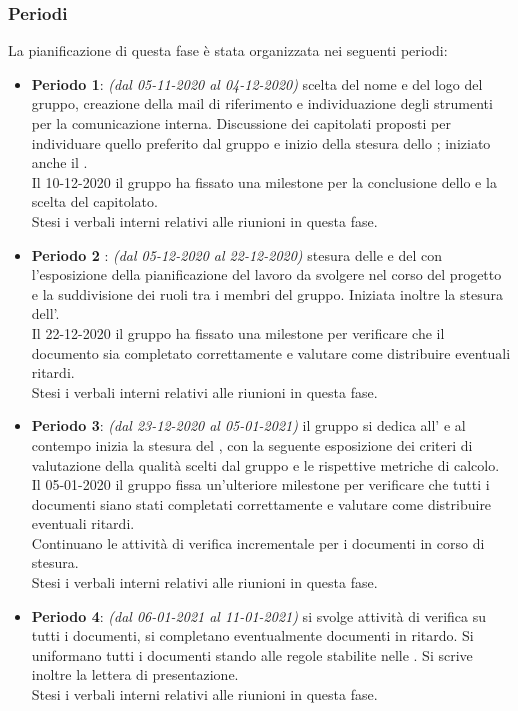 \subsubsection{Periodi}
La pianificazione di questa fase è stata organizzata nei seguenti periodi:
\begin{itemize}
\item \textbf{Periodo 1}: \textit{(dal 05-11-2020 al 04-12-2020)} scelta del nome e del logo del gruppo, creazione della mail di riferimento e individuazione degli strumenti per la comunicazione interna. Discussione dei capitolati proposti per individuare quello preferito dal gruppo e inizio della stesura dello \SdF{}; iniziato anche il \Glossario. \\Il 10-12-2020 il gruppo ha fissato una milestone\glo{} per la conclusione dello \SdF{} e la scelta del capitolato.\\Stesi i verbali interni relativi alle riunioni in questa fase.
\item \textbf{Periodo 2 }: \textit{(dal 05-12-2020 al 22-12-2020)} stesura delle \NdP{} e del \PdP{} con l'esposizione della pianificazione del lavoro da svolgere nel corso del progetto e la suddivisione dei ruoli tra i membri del gruppo. Iniziata inoltre la stesura dell'\AdR{}.\\Il 22-12-2020 il gruppo ha fissato una milestone\glo{} per verificare che il documento \NdP{} sia completato correttamente e valutare come distribuire eventuali ritardi.\\Stesi i verbali interni relativi alle riunioni in questa fase.
\item \textbf{Periodo 3}: \textit{(dal 23-12-2020 al 05-01-2021)} il gruppo si dedica all'\AdR{} e al contempo inizia la stesura del \PdQ{}, con la seguente esposizione dei criteri di valutazione della qualità scelti dal gruppo e le rispettive metriche\glo{} di calcolo.\\Il 05-01-2020 il gruppo fissa un'ulteriore milestone\glo{} per verificare che tutti i documenti siano stati completati correttamente e valutare come distribuire eventuali ritardi.\\Continuano le attività di verifica incrementale per i documenti in corso di stesura.\\Stesi i verbali interni relativi alle riunioni in questa fase.
\item \textbf{Periodo 4}: \textit{(dal 06-01-2021 al 11-01-2021)} si svolge attività di verifica su tutti i documenti, si completano eventualmente documenti in ritardo. Si uniformano tutti i documenti stando alle regole stabilite nelle \NdP{}. Si scrive inoltre la lettera di presentazione.\\Stesi i verbali interni relativi alle riunioni in questa fase.
\end{itemize}

